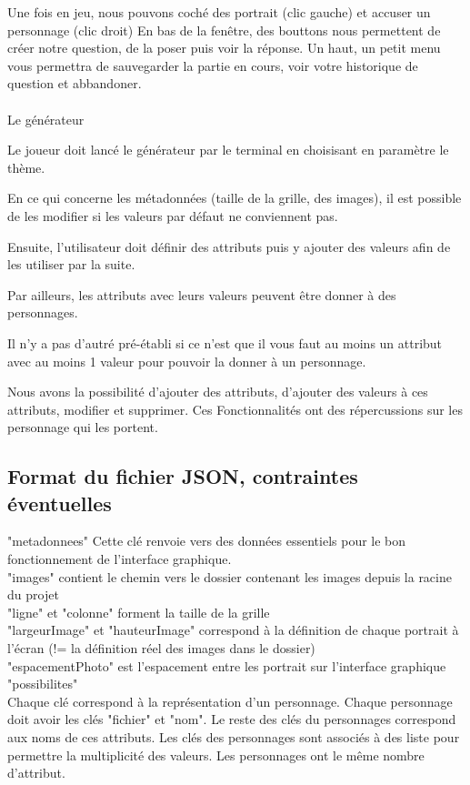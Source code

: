 \documentclass[a4paper]{article}
\begin{document}
Une fois en jeu, nous pouvons coché des portrait (clic gauche) et accuser un personnage (clic droit)
En bas de la fenêtre, des bouttons nous permettent de créer notre question, de la poser puis voir la réponse.
Un haut, un petit menu vous permettra de sauvegarder la partie en cours, voir votre historique de question et abbandoner.

\paragraph*{}
Le générateur

Le joueur doit lancé le générateur par le terminal en choisisant en paramètre le thème.

En ce qui concerne les métadonnées (taille de la grille, des images), il est possible de les modifier si les valeurs par défaut ne conviennent pas.

Ensuite, l'utilisateur doit définir des attributs puis y ajouter des valeurs afin de les utiliser par la suite.

Par ailleurs, les attributs avec leurs valeurs peuvent être donner à des personnages.

Il n'y a pas d'autré pré-établi si ce n'est que il vous faut au moins un attribut avec au moins 1 valeur pour pouvoir la donner à un personnage. 

Nous avons la possibilité d'ajouter des attributs, d'ajouter des valeurs à ces attributs, modifier et supprimer. Ces Fonctionnalités ont des répercussions sur les personnage qui les portent.


\subsection*{Format du fichier JSON, contraintes éventuelles}
"metadonnees" Cette clé renvoie vers des données essentiels pour le bon fonctionnement de l'interface graphique.\\
"images" contient le chemin vers le dossier contenant les images depuis la racine du projet \\
"ligne" et "colonne" forment la taille de la grille\\
"largeurImage" et "hauteurImage" correspond à la définition de chaque portrait à l'écran (!= la définition réel des images dans le dossier)\\
"espacementPhoto" est l'espacement entre les portrait sur l'interface graphique\\
"possibilites"\\
Chaque clé correspond à la représentation d'un personnage.
Chaque personnage doit avoir les clés "fichier" et "nom".
Le reste des clés du personnages correspond aux noms de ces attributs.
Les clés des personnages sont associés à des liste pour permettre la multiplicité des valeurs.
Les personnages ont le même nombre d'attribut.
\end{document}

